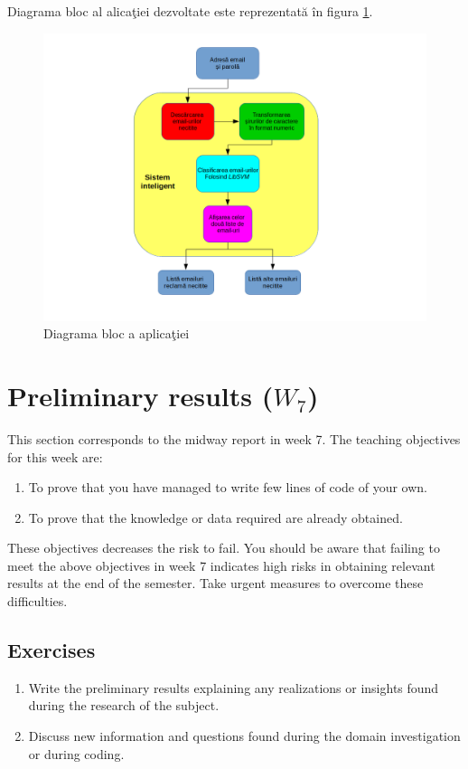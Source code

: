 \documentclass[a4paper,12pt]{report}
\begin{document}
  \par
  Diagrama bloc al alica\c tiei dezvoltate este reprezentat\u a \^in figura \ref{fig.blocDiagram}.
  
  \begin{figure}[h]
    \includegraphics[scale=0.7]{fig/BlocDiagram.png}
    \caption{Diagrama bloc a aplica\c tiei}
    \label{fig.blocDiagram}
  \end{figure}
  


  
  
  



\chapter{Preliminary results ($W_7$)}
This section corresponds to the midway report in week 7.
The teaching objectives for this week are:
\begin{enumerate}
 \item To prove that you have managed to write few lines of code of your own.
\item To prove that the knowledge or data required are already obtained.
\end{enumerate}

These objectives decreases the risk to fail. 
You should be aware that failing to meet the above objectives in week 
7 indicates high risks in obtaining relevant results at the end of the semester.
Take urgent measures to overcome these difficulties.


\section{Exercises}
\begin{enumerate}
\item Write the preliminary results explaining any realizations or insights found during the research of the subject.
\item Discuss new information and questions found during the domain investigation or during coding.
\end{enumerate}
\end{document}
